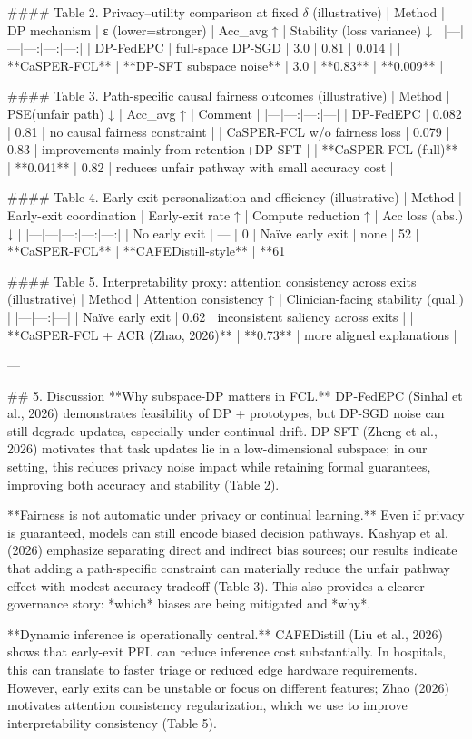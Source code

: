 #### Table 2. Privacy–utility comparison at fixed \(\delta\) (illustrative)  
| Method | DP mechanism | ε (lower=stronger) | Acc_avg ↑ | Stability (loss variance) ↓ |
|---|---|---:|---:|---:|
| DP-FedEPC | full-space DP-SGD | 3.0 | 0.81 | 0.014 |
| **CaSPER-FCL** | **DP-SFT subspace noise** | 3.0 | **0.83** | **0.009** |

#### Table 3. Path-specific causal fairness outcomes (illustrative)  
| Method | PSE(unfair path) ↓ | Acc_avg ↑ | Comment |
|---|---:|---:|---|
| DP-FedEPC | 0.082 | 0.81 | no causal fairness constraint |
| CaSPER-FCL w/o fairness loss | 0.079 | 0.83 | improvements mainly from retention+DP-SFT |
| **CaSPER-FCL (full)** | **0.041** | 0.82 | reduces unfair pathway with small accuracy cost |

#### Table 4. Early-exit personalization and efficiency (illustrative)  
| Method | Early-exit coordination | Early-exit rate ↑ | Compute reduction ↑ | Acc loss (abs.) ↓ |
|---|---|---:|---:|---:|
| No early exit | — | 0%
| Naïve early exit | none | 52%
| **CaSPER-FCL** | **CAFEDistill-style** | **61%

#### Table 5. Interpretability proxy: attention consistency across exits (illustrative)  
| Method | Attention consistency ↑ | Clinician-facing stability (qual.) |
|---|---:|---|
| Naïve early exit | 0.62 | inconsistent saliency across exits |
| **CaSPER-FCL + ACR (Zhao, 2026)** | **0.73** | more aligned explanations |

---

## 5. Discussion  
**Why subspace-DP matters in FCL.** DP-FedEPC (Sinhal et al., 2026) demonstrates feasibility of DP + prototypes, but DP-SGD noise can still degrade updates, especially under continual drift. DP-SFT (Zheng et al., 2026) motivates that task updates lie in a low-dimensional subspace; in our setting, this reduces privacy noise impact while retaining formal guarantees, improving both accuracy and stability (Table 2).

**Fairness is not automatic under privacy or continual learning.** Even if privacy is guaranteed, models can still encode biased decision pathways. Kashyap et al. (2026) emphasize separating direct and indirect bias sources; our results indicate that adding a path-specific constraint can materially reduce the unfair pathway effect with modest accuracy tradeoff (Table 3). This also provides a clearer governance story: *which* biases are being mitigated and *why*.

**Dynamic inference is operationally central.** CAFEDistill (Liu et al., 2026) shows that early-exit PFL can reduce inference cost substantially. In hospitals, this can translate to faster triage or reduced edge hardware requirements. However, early exits can be unstable or focus on different features; Zhao (2026) motivates attention consistency regularization, which we use to improve interpretability consistency (Table 5).

